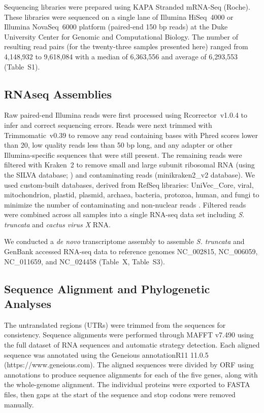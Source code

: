 \documentclass[fleqn,10pt,lineno]{wlpeerj}
\begin{document}
Sequencing libraries were prepared using KAPA Stranded mRNA-Seq (Roche).
These libraries were sequenced on a single lane of Illumina \mbox{HiSeq}~4000 or Illumina \mbox{NovaSeq}~6000 platform (paired-end 150 bp reads) at the Duke University Center for Genomic and Computational Biology.
The number of resulting read pairs (for the twenty-three samples presented here) ranged from 4,148,932 to 9,618,084 with a median of 6,363,556 and average of 6,293,553 (Table~S1).

\subsection*{RNAseq Assemblies}

Raw paired-end Illumina reads were first processed using \mbox{Rcorrector}~v1.0.4 \citep{song2015} to infer and correct sequencing errors.
Reads were next trimmed with \mbox{Trimmomatic}~v0.39 \citep{bolger2014} to remove any read containing bases with Phred scores lower than 20, low quality reads less than 50 bp long, and any adapter or other Illumina-specific sequences that were still present.
The remaining reads were filtered with \mbox{Kraken}~2 \citep{wood2019} to remove small and large subunit ribosomal RNA (using the SILVA database; \citealt{quast2013}) and contaminating reads (minikraken2\_v2 database).
We used custom-built databases, derived from RefSeq libraries: UniVec\_Core, viral, mitochondrion, plastid, plasmid, archaea, bacteria, protozoa, human, and fungi to minimize the number of contaminating and non-nuclear reads \citep{ramanauskas2021}.
Filtered reads were combined across all samples into a single RNA-seq data set including \textit{S. truncata} and \textit{cactus virus X} RNA.

We conducted a \textit{de novo} transcriptome assembly to assemble \textit{S. truncata} and GenBank accessed RNA-seq data to reference genomes NC\_002815, NC\_006059, NC\_011659, and NC\_024458 (Table~X, Table~S3).


\subsection*{Sequence Alignment and Phylogenetic Analyses}

The untranslated regions (UTRs) were trimmed from the sequences for consistency.
Sequence alignments were performed through MAFFT v7.490 \citep{katoh_mafft_2002} using the full dataset of RNA sequences and automatic strategy detection. 
Each aligned sequence was annotated using the Geneious annotationR11 11.0.5 (https://www.geneious.com).
The aligned sequences were divided by ORF using annotations to produce sequence alignments for each of the five genes, along with the whole-genome alignment. 
The individual proteins were exported to FASTA files, then gaps at the start of the sequence and stop codons were removed manually. 
\end{document}
